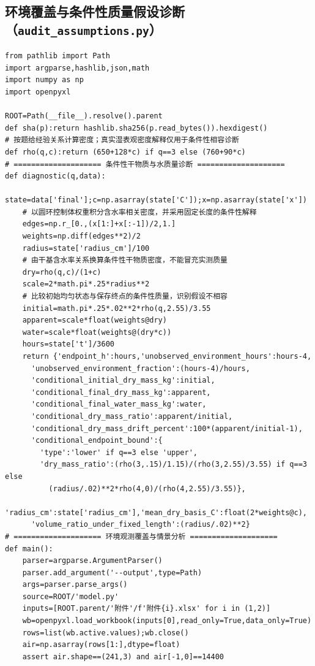 \subsection{环境覆盖与条件性质量假设诊断（\texttt{audit\_assumptions.py}）}
\begin{Verbatim}[fontsize=\scriptsize,breaklines=true,breakanywhere=true]
from pathlib import Path
import argparse,hashlib,json,math
import numpy as np
import openpyxl

ROOT=Path(__file__).resolve().parent
def sha(p):return hashlib.sha256(p.read_bytes()).hexdigest()
# 按题给经验关系计算密度；真实湿表观密度解释仅用于条件性相容诊断
def rho(q,c):return (650+128*c) if q==3 else (760+90*c)
# ==================== 条件性干物质与水质量诊断 ====================
def diagnostic(q,data):
    state=data['final'];c=np.asarray(state['C']);x=np.asarray(state['x'])
    # 以圆环控制体权重积分含水率相关密度，并采用固定长度的条件性解释
    edges=np.r_[0.,(x[1:]+x[:-1])/2,1.]
    weights=np.diff(edges**2)/2
    radius=state['radius_cm']/100
    # 由干基含水率关系换算条件性干物质密度，不能冒充实测质量
    dry=rho(q,c)/(1+c)
    scale=2*math.pi*.25*radius**2
    # 比较初始均匀状态与保存终点的条件性质量，识别假设不相容
    initial=math.pi*.25*.02**2*rho(q,2.55)/3.55
    apparent=scale*float(weights@dry)
    water=scale*float(weights@(dry*c))
    hours=state['t']/3600
    return {'endpoint_h':hours,'unobserved_environment_hours':hours-4,
      'unobserved_environment_fraction':(hours-4)/hours,
      'conditional_initial_dry_mass_kg':initial,
      'conditional_final_dry_mass_kg':apparent,
      'conditional_final_water_mass_kg':water,
      'conditional_dry_mass_ratio':apparent/initial,
      'conditional_dry_mass_drift_percent':100*(apparent/initial-1),
      'conditional_endpoint_bound':{
        'type':'lower' if q==3 else 'upper',
        'dry_mass_ratio':(rho(3,.15)/1.15)/(rho(3,2.55)/3.55) if q==3 else
          (radius/.02)**2*rho(4,0)/(rho(4,2.55)/3.55)},
      'radius_cm':state['radius_cm'],'mean_dry_basis_C':float(2*weights@c),
      'volume_ratio_under_fixed_length':(radius/.02)**2}
# ==================== 环境观测覆盖与情景分析 ====================
def main():
    parser=argparse.ArgumentParser()
    parser.add_argument('--output',type=Path)
    args=parser.parse_args()
    source=ROOT/'model.py'
    inputs=[ROOT.parent/'附件'/f'附件{i}.xlsx' for i in (1,2)]
    wb=openpyxl.load_workbook(inputs[0],read_only=True,data_only=True)
    rows=list(wb.active.values);wb.close()
    air=np.asarray(rows[1:],dtype=float)
    assert air.shape==(241,3) and air[-1,0]==14400

\end{Verbatim}

